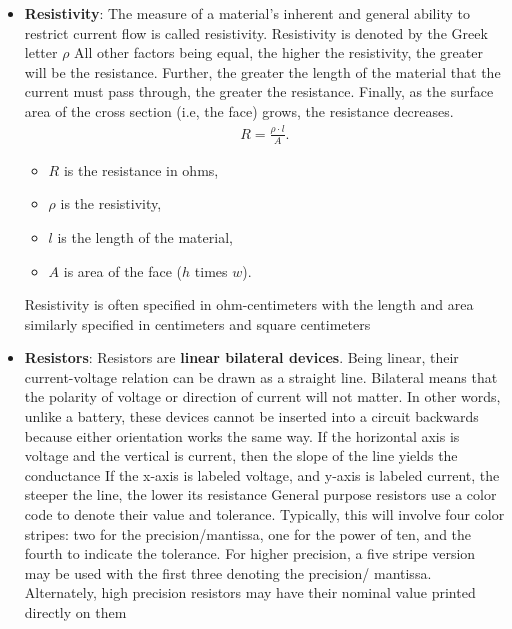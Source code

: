 \documentclass{report}
\begin{document}
\begin{itemize}
\begin{align*}
            .\end{align*}
        \item \textbf{Resistivity}: The measure of a material's inherent and general ability to restrict current flow is called resistivity. Resistivity is denoted by the Greek letter $\rho$ 
            \bigbreak \noindent 
            All other factors being equal, the higher the resistivity, the greater will be the resistance. Further, the greater the length of the material that the current must pass through, the greater the resistance. Finally, as the surface area of the cross section (i.e, the face) grows, the resistance decreases.
            \begin{align*}
                R = \frac{\rho \cdot l}{A}
            .\end{align*}
            \begin{itemize}
                \item $R$ is the resistance in ohms,
                \item $\rho$ is the resistivity,
                \item $l$ is the length of the material,
                \item $A$ is area of the face ($h$ times $w$).
            \end{itemize}
            Resistivity is often specified in ohm-centimeters with the length and area similarly specified in centimeters and square centimeters
        \item \textbf{Resistors}: Resistors are \textbf{linear bilateral devices}. Being linear, their current-voltage relation can be drawn as a straight line. Bilateral means that the polarity of voltage or direction of current will not matter. In other words, unlike a battery, these devices cannot be inserted into a circuit backwards because either orientation works the same way. If the horizontal axis is voltage and the vertical is current, then the slope of the line yields the conductance
            \bigbreak \noindent 
            If the x-axis is labeled voltage, and y-axis is labeled current, the steeper the line, the lower its resistance
            \bigbreak \noindent 
            General purpose resistors use a color code to denote their value and tolerance. Typically, this will involve four color stripes: two for the precision/mantissa, one for the power of ten, and the fourth to indicate the tolerance. For higher precision, a five stripe version may be used with the first three denoting the precision/ mantissa. Alternately, high precision resistors may have their nominal value printed directly on them

\end{itemize}
\end{document}
